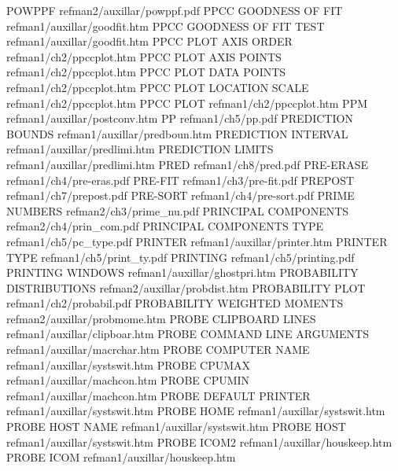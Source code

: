 POWPPF                                  refman2/auxillar/powppf.pdf
PPCC GOODNESS OF FIT                    refman1/auxillar/goodfit.htm
PPCC GOODNESS OF FIT TEST               refman1/auxillar/goodfit.htm
PPCC PLOT AXIS ORDER                    refman1/ch2/ppccplot.htm
PPCC PLOT AXIS POINTS                   refman1/ch2/ppccplot.htm
PPCC PLOT DATA POINTS                   refman1/ch2/ppccplot.htm
PPCC PLOT LOCATION SCALE                refman1/ch2/ppccplot.htm
PPCC PLOT                               refman1/ch2/ppccplot.htm
PPM                                     refman1/auxillar/postconv.htm
PP                                      refman1/ch5/pp.pdf
PREDICTION BOUNDS                       refman1/auxillar/predboun.htm
PREDICTION INTERVAL                     refman1/auxillar/predlimi.htm
PREDICTION LIMITS                       refman1/auxillar/predlimi.htm
PRED                                    refman1/ch8/pred.pdf
PRE-ERASE                               refman1/ch4/pre-eras.pdf
PRE-FIT                                 refman1/ch3/pre-fit.pdf
PREPOST                                 refman1/ch7/prepost.pdf
PRE-SORT                                refman1/ch4/pre-sort.pdf
PRIME NUMBERS                           refman2/ch3/prime_nu.pdf
PRINCIPAL COMPONENTS                    refman2/ch4/prin_com.pdf
PRINCIPAL COMPONENTS TYPE               refman1/ch5/pc_type.pdf
PRINTER                                 refman1/auxillar/printer.htm
PRINTER TYPE                            refman1/ch5/print_ty.pdf
PRINTING                                refman1/ch5/printing.pdf
PRINTING WINDOWS                        refman1/auxillar/ghostpri.htm
PROBABILITY DISTRIBUTIONS               refman2/auxillar/probdist.htm
PROBABILITY PLOT                        refman1/ch2/probabil.pdf
PROBABILITY WEIGHTED MOMENTS            refman2/auxillar/probmome.htm
PROBE CLIPBOARD LINES                   refman1/auxillar/clipboar.htm
PROBE COMMAND LINE ARGUMENTS            refman1/auxillar/macrchar.htm
PROBE COMPUTER NAME                     refman1/auxillar/systswit.htm
PROBE CPUMAX                            refman1/auxillar/machcon.htm
PROBE CPUMIN                            refman1/auxillar/machcon.htm
PROBE DEFAULT PRINTER                   refman1/auxillar/systswit.htm
PROBE HOME                              refman1/auxillar/systswit.htm
PROBE HOST NAME                         refman1/auxillar/systswit.htm
PROBE HOST                              refman1/auxillar/systswit.htm
PROBE ICOM2                             refman1/auxillar/houskeep.htm
PROBE ICOM                              refman1/auxillar/houskeep.htm
